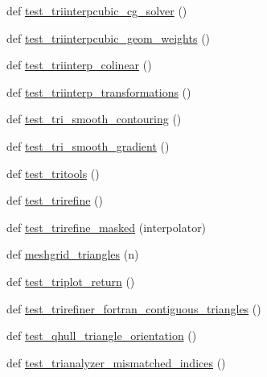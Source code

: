 \begin{DoxyCompactItemize}
def \hyperlink{namespacematplotlib_1_1tests_1_1test__triangulation_afd99b5a9060c4fd35fce6a7c99b1779a}{test\+\_\+triinterpcubic\+\_\+cg\+\_\+solver} ()
\item 
def \hyperlink{namespacematplotlib_1_1tests_1_1test__triangulation_a7ba918ad5bda1a58552e3c08723ec470}{test\+\_\+triinterpcubic\+\_\+geom\+\_\+weights} ()
\item 
def \hyperlink{namespacematplotlib_1_1tests_1_1test__triangulation_a323b7987c1e9e1d2ab14759310a98838}{test\+\_\+triinterp\+\_\+colinear} ()
\item 
def \hyperlink{namespacematplotlib_1_1tests_1_1test__triangulation_abedc37c0da851a2d97a9d7ac62dc901b}{test\+\_\+triinterp\+\_\+transformations} ()
\item 
def \hyperlink{namespacematplotlib_1_1tests_1_1test__triangulation_aad0204ff2be0d92513a4fefc14d6feb5}{test\+\_\+tri\+\_\+smooth\+\_\+contouring} ()
\item 
def \hyperlink{namespacematplotlib_1_1tests_1_1test__triangulation_a2c7e0eb9148516b22d6539f3f39a6d0b}{test\+\_\+tri\+\_\+smooth\+\_\+gradient} ()
\item 
def \hyperlink{namespacematplotlib_1_1tests_1_1test__triangulation_ad782b2e8e709192b565e921e51fa4666}{test\+\_\+tritools} ()
\item 
def \hyperlink{namespacematplotlib_1_1tests_1_1test__triangulation_a1a74d1679c012b29de3e9e543419621b}{test\+\_\+trirefine} ()
\item 
def \hyperlink{namespacematplotlib_1_1tests_1_1test__triangulation_aac58e87550405ac81acf8b4a4bde13c7}{test\+\_\+trirefine\+\_\+masked} (interpolator)
\item 
def \hyperlink{namespacematplotlib_1_1tests_1_1test__triangulation_aae8efee294742cb2eb4569443cb7243d}{meshgrid\+\_\+triangles} (n)
\item 
def \hyperlink{namespacematplotlib_1_1tests_1_1test__triangulation_a93d236e92c849ff729dd419d9834a3f7}{test\+\_\+triplot\+\_\+return} ()
\item 
def \hyperlink{namespacematplotlib_1_1tests_1_1test__triangulation_a6933c74d47db3e3112fb7d77cf11db48}{test\+\_\+trirefiner\+\_\+fortran\+\_\+contiguous\+\_\+triangles} ()
\item 
def \hyperlink{namespacematplotlib_1_1tests_1_1test__triangulation_a79a9f759919fcce6c79ae5ce30a0d626}{test\+\_\+qhull\+\_\+triangle\+\_\+orientation} ()
\item 
def \hyperlink{namespacematplotlib_1_1tests_1_1test__triangulation_a5063d6d1a396fd0b25b3cd5627241097}{test\+\_\+trianalyzer\+\_\+mismatched\+\_\+indices} ()

\end{DoxyCompactItemize}
